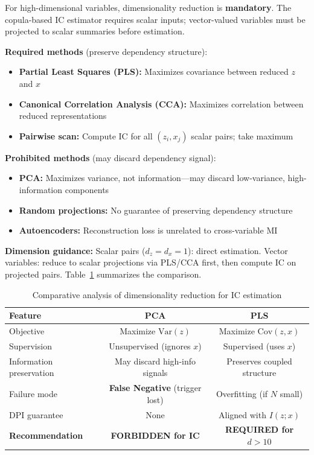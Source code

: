 \documentclass[10pt]{article} %
\theoremstyle{plain}
\theoremstyle{definition}
\newcommand{\Var}{\mathrm{Var}}
\newcommand{\Cov}{\mathrm{Cov}}
\begin{document}
\begin{tcolorbox}[breakable, colback=blue!5, colframe=blue!50!black, title=\textbf{Mandatory: Dimensionality Reduction for High-Dimensional IC}, fonttitle=\bfseries]
For high-dimensional variables, dimensionality reduction is \textbf{mandatory}. The copula-based IC estimator requires scalar inputs; vector-valued variables must be projected to scalar summaries before estimation.

\textbf{Required methods} (preserve dependency structure):
\begin{itemize}
    \item \textbf{Partial Least Squares (PLS):} Maximizes covariance between reduced $z$ and $x$
    \item \textbf{Canonical Correlation Analysis (CCA):} Maximizes correlation between reduced representations
    \item \textbf{Pairwise scan:} Compute IC for all $(z_i, x_j)$ scalar pairs; take maximum
\end{itemize}

\textbf{Prohibited methods} (may discard dependency signal):
\begin{itemize}
    \item \textbf{PCA:} Maximizes variance, not information---may discard low-variance, high-information components
    \item \textbf{Random projections:} No guarantee of preserving dependency structure
    \item \textbf{Autoencoders:} Reconstruction loss is unrelated to cross-variable MI
\end{itemize}

\textbf{Dimension guidance:} Scalar pairs ($d_z = d_x = 1$): direct estimation. Vector variables: reduce to scalar projections via PLS/CCA first, then compute IC on projected pairs. Table~\ref{tab:pca-pls} summarizes the comparison.
\end{tcolorbox}

\begin{table}[!htbp]
\centering
\caption{Comparative analysis of dimensionality reduction for IC estimation}
\label{tab:pca-pls}
\small
\begin{tabular}{lcc}
\toprule
\textbf{Feature} & \textbf{PCA} & \textbf{PLS} \\
\midrule
Objective & Maximize $\Var(z)$ & Maximize $\Cov(z,x)$ \\
Supervision & Unsupervised (ignores $x$) & Supervised (uses $x$) \\
Information preservation & May discard high-info signals & Preserves coupled structure \\
Failure mode & \textbf{False Negative} (trigger lost) & Overfitting (if $N$ small) \\
DPI guarantee & None & Aligned with $I(z;x)$ \\
\textbf{Recommendation} & \textbf{FORBIDDEN for IC} & \textbf{REQUIRED for $d > 10$} \\
\bottomrule
\end{tabular}
\end{table}
\end{document}

